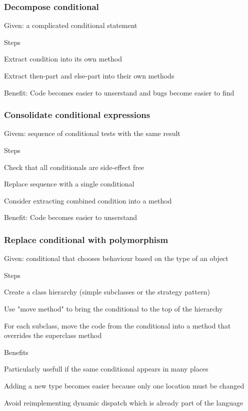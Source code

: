 \subsubsection{Decompose conditional}
\enumstart
	\item Given: a complicated conditional statement
	\item Steps
	\enumstart
		\item Extract condition into its own method
		\item Extract then-part and else-part into their own methods
	\enumend
	\item Benefit: Code becomes easier to unserstand and bugs become easier to find
\enumend

\subsubsection{Consolidate conditional expressions}
\enumstart
	\item Givem: sequence of conditional tests with the same result
	\item Steps
	\enumstart
		\item Check that all conditionals are side-effect free
		\item Replace sequence with a single conditional
		\item Consider extracting combined condition into a method
	\enumend
	\item Benefit: Code becomes easier to unserstand
\enumend

\subsubsection{Replace conditional with polymorphism}
\enumstart
	\item Given: conditional that chooses behaviour based on the type of an object
	\item Steps
	\enumstart
		\item Create a class hierarchy (simple subclasses or the strategy pattern)
		\item Use "move method" to bring the conditional to the top of the hierarchy
		\item For each subclass, move the code from the conditional into a method that overrides the superclass method
	\enumend
	\item Benefits
	\enumstart
		\item Particularly usefull if the same conditional appears in many places
		\item Adding a new type becomes easier because only one location must be changed
		\item Avoid reimplementing dynamic dispatch which is already part of the language
	\enumend
\enumend

